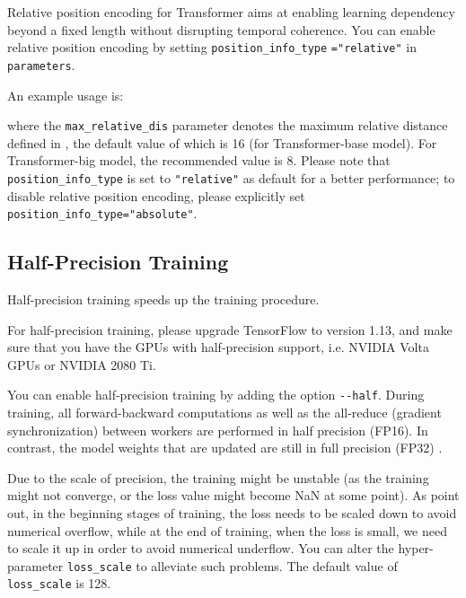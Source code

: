 \documentclass{article}
\begin{document}
Relative position encoding \citep{N18-2074} for Transformer aims at enabling learning dependency beyond a fixed length without disrupting temporal coherence. You can enable relative position encoding by setting \verb|position_info_type| \verb|="relative"| in \verb|parameters|. 

An example usage is:

where the \verb|max_relative_dis| parameter denotes the maximum relative distance defined in \citet{N18-2074}, the default value of which is 16 (for Transformer-base model). For Transformer-big model, the recommended value is 8. Please note that \verb|position_info_type| is set to \verb|"relative"| as default for a better performance; to disable relative position encoding, please explicitly set \verb|position_info_type="absolute"|.

\subsection{Half-Precision Training}

Half-precision training \citep{W18-6301} speeds up the training procedure.

For half-precision training, please upgrade TensorFlow to version 1.13, and make sure that you have the GPUs with half-precision support, i.e. NVIDIA Volta GPUs or NVIDIA 2080 Ti.

You can enable half-precision training by adding the option \verb|--half|. During training, all forward-backward computations as well as the all-reduce (gradient synchronization) between workers are performed in half precision (FP16). In contrast, the model weights that are updated are still in full precision (FP32) \cite{W18-6301}.

Due to the scale of precision, the training might be unstable (as the training might not converge, or the loss value might become NaN at some point). As \citet{W18-6301} point out, in the beginning stages of training, the loss
needs to be scaled down to avoid numerical overflow, while at the end of training, when the loss is small, we need to scale it up in order to avoid numerical underflow. You can alter the hyper-parameter \verb|loss_scale| to alleviate such problems. The default value of \verb|loss_scale| is 128.
\end{document}
